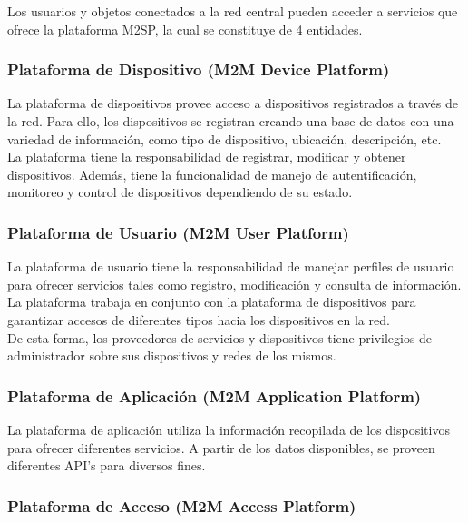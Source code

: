 \documentclass[journal]{IEEEtran}
\begin{document}
Los usuarios y objetos conectados a la red central pueden acceder a servicios que ofrece la plataforma M2SP, la cual se constituye de 4 entidades.\\

\subsubsection{Plataforma de Dispositivo (M2M Device Platform)}


La plataforma de dispositivos provee acceso a dispositivos registrados a través de la red. Para ello, los dispositivos se registran creando una base de datos con una variedad de información, como tipo de dispositivo, ubicación, descripción, etc.\\
La plataforma tiene la responsabilidad de registrar, modificar y obtener dispositivos. Además, tiene la funcionalidad de manejo de autentificación, monitoreo y control de dispositivos dependiendo de su estado.\\

\subsubsection{Plataforma de Usuario (M2M User Platform)}

La plataforma de usuario tiene la responsabilidad de manejar perfiles de usuario para ofrecer servicios tales como registro, modificación y consulta de información. La plataforma trabaja en conjunto con la plataforma de dispositivos para garantizar accesos de diferentes tipos hacia los dispositivos en la red.\\
De esta forma, los proveedores de servicios y dispositivos tiene privilegios de administrador sobre sus dispositivos y redes de los mismos.\\

\subsubsection{Plataforma de Aplicación (M2M Application Platform)}

La plataforma de aplicación utiliza la información recopilada de los dispositivos para ofrecer diferentes servicios. A partir de los datos disponibles, se proveen diferentes API's para diversos fines.\\

\subsubsection{Plataforma de Acceso (M2M Access Platform)}
\end{document}
